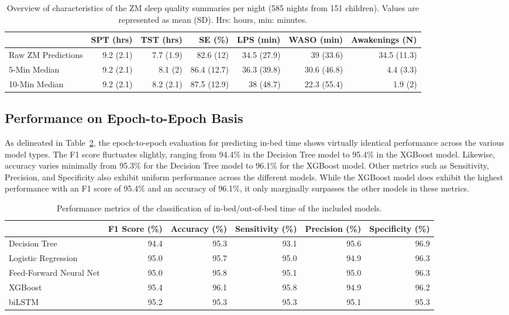 \documentclass[
  10pt,
]{scrbook}
\begin{document}
\hypertarget{tbl-10}{}
\begin{longtable}{lrrrrrr}
\caption{\label{tbl-10}Overview of characteristics of the ZM sleep quality summaries per night
(585 nights from 151 children). Values are represented as mean (SD).
Hrs: hours, min: minutes. }\tabularnewline

\toprule
 & SPT (hrs) & TST (hrs) & SE (\%) & LPS (min) & WASO (min) & Awakenings (N) \\ 
\midrule
Raw ZM Predictions & 9.2 (2.1) & 7.7 (1.9) & 82.6 (12) & 34.5 (27.9) & 39 (33.6) & 34.5 (11.3) \\ 
5-Min Median & 9.2 (2.1) & 8.1 (2) & 86.4 (12.7) & 36.3 (39.8) & 30.6 (46.8) & 4.4 (3.3) \\ 
10-Min Median & 9.2 (2.1) & 8.2 (2.1) & 87.5 (12.9) & 38 (48.7) & 22.3 (55.4) & 1.9 (2) \\ 
\bottomrule
\end{longtable}

\endgroup

\hypertarget{performance-on-epoch-to-epoch-basis}{%
\subsection{Performance on Epoch-to-Epoch
Basis}\label{performance-on-epoch-to-epoch-basis}}

As delineated in Table~\ref{tbl-11}, the epoch-to-epoch evaluation for
predicting in-bed time shows virtually identical performance across the
various model types. The F1 score fluctuates slightly, ranging from
94.4\% in the Decision Tree model to 95.4\% in the XGBoost model.
Likewise, accuracy varies minimally from 95.3\% for the Decision Tree
model to 96.1\% for the XGBoost model. Other metrics such as
Sensitivity, Precision, and Specificity also exhibit uniform performance
across the different models. While the XGBoost model does exhibit the
highest performance with an F1 score of 95.4\% and an accuracy of
96.1\%, it only marginally surpasses the other models in these metrics.

\begingroup

\footnotesize

\hypertarget{tbl-11}{}
\begin{longtable}{lrrrrr}
\caption{\label{tbl-11}Performance metrics of the classification of in-bed/out-of-bed time of
the included models. }\tabularnewline

\toprule
 & F1 Score (\%) & Accuracy (\%) & Sensitivity (\%) & Precision (\%) & Specificity (\%) \\ 
\midrule
Decision Tree & 94.4 & 95.3 & 93.1 & 95.6 & 96.9 \\ 
Logistic Regression & 95.0 & 95.7 & 95.0 & 94.9 & 96.3 \\ 
Feed-Forward Neural Net & 95.0 & 95.8 & 95.1 & 95.0 & 96.3 \\ 
XGBoost & 95.4 & 96.1 & 95.8 & 94.9 & 96.2 \\ 
biLSTM & 95.2 & 95.3 & 95.3 & 95.1 & 95.3 \\ 
\bottomrule
\end{longtable}
\end{document}
